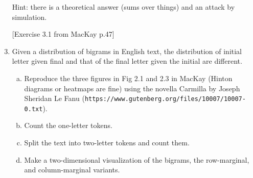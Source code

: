 \documentclass[12pt]{book}
\theoremstyle{definition}
\begin{document}
\begin{enumerate}
\item[] Hint: there is a theoretical answer (sums over things) and an attack by simulation.
\item[][Exercise 3.1 from MacKay p.47] 

\item Given a distribution of bigrams in English text, the distribution of initial letter given final and that of the final letter given the initial are different.  

 \begin{enumerate}[a.] 
   \item Reproduce the three figures in Fig 2.1 and 2.3 in MacKay  (Hinton diagrams or heatmaps are fine) using the novella Carmilla by Joseph Sheridan Le Fanu (\texttt{https://www.gutenberg.org/files/10007/10007-0.txt}).   
   \item Count the one-letter tokens.  
   \item Split the text into two-letter tokens and count them.  
   \item Make a two-dimensional visualization of the bigrams, the row-marginal, and column-marginal variants. 
 \end{enumerate}  

\end{enumerate}
\end{document}
